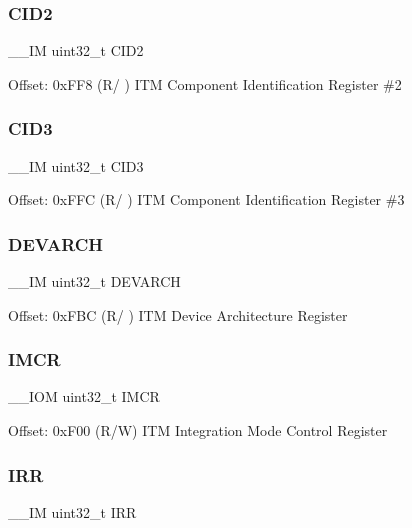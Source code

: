\subsubsection{\texorpdfstring{CID2}{CID2}}
{\footnotesize\ttfamily \+\_\+\+\_\+\+IM uint32\+\_\+t C\+I\+D2}

Offset\+: 0x\+F\+F8 (R/ ) I\+TM Component Identification Register \#2 \mbox{\label{struct_i_t_m___type_ab9af64f413bf6f67e2a8044481292f67}} 
\subsubsection{\texorpdfstring{CID3}{CID3}}
{\footnotesize\ttfamily \+\_\+\+\_\+\+IM uint32\+\_\+t C\+I\+D3}

Offset\+: 0x\+F\+FC (R/ ) I\+TM Component Identification Register \#3 \mbox{\label{struct_i_t_m___type_ae370aa5dc47fe03310e1d847333030e7}} 
\subsubsection{\texorpdfstring{DEVARCH}{DEVARCH}}
{\footnotesize\ttfamily \+\_\+\+\_\+\+IM uint32\+\_\+t D\+E\+V\+A\+R\+CH}

Offset\+: 0x\+F\+BC (R/ ) I\+TM Device Architecture Register \mbox{\label{struct_i_t_m___type_af0446ee5dcb6082dc8bba9adcc8ec812}} 
\subsubsection{\texorpdfstring{IMCR}{IMCR}}
{\footnotesize\ttfamily \+\_\+\+\_\+\+I\+OM uint32\+\_\+t I\+M\+CR}

Offset\+: 0x\+F00 (R/W) I\+TM Integration Mode Control Register \mbox{\label{struct_i_t_m___type_ae300b6ee4d883ceec8f3572fc0fc3d69}} 
\subsubsection{\texorpdfstring{IRR}{IRR}}
{\footnotesize\ttfamily \+\_\+\+\_\+\+IM uint32\+\_\+t I\+RR}

